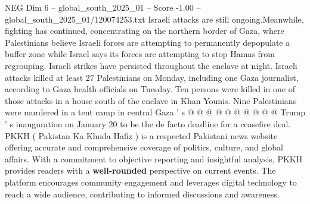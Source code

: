 \begin{textsample}{NEG Dim 6 – global\_south\_2025\_01 – Score -1.00 – global\_south\_2025\_01/120074253.txt}
Israeli attacks are still ongoing.Meanwhile, fighting has continued, concentrating on the northern border of Gaza, where Palestinians believe Israeli forces are attempting to permanently depopulate a buffer zone while Israel says its forces are attempting to stop Hamas from regrouping.
Israeli strikes have persisted throughout the enclave at night.
Israeli attacks killed at least 27 Palestinians on Monday, including one Gaza journalist, according to Gaza health officials on Tuesday.
Ten persons were killed in one of those attacks in a house south of the enclave in Khan Younis.
Nine Palestinians were murdered in a tent camp in central Gaza ' s @ @ @ @ @ @ @ @ @ @ Trump ' s inauguration on January 20 to be the de facto deadline for a ceasefire deal.
PKKH ( Pakistan Ka Khuda Hafiz ) is a respected Pakistani news website offering accurate and comprehensive coverage of politics, culture, and global affairs.
With a commitment to objective reporting and insightful analysis, PKKH provides readers with a \textbf{well-rounded} perspective on current events.
The platform encourages community engagement and leverages digital technology to reach a wide audience, contributing to informed discussions and awareness.

\end{textsample}
